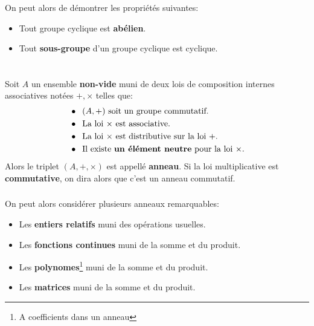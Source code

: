 \subsection*{}
On peut alors de démontrer les propriétés suivantes:

\begin{center}
   \begin{itemize}
      \item Tout groupe cyclique est \textbf{abélien}.
      \item Tout \textbf{sous-groupe} d'un groupe cyclique est cyclique.
   \end{itemize}
\end{center}

\chapter*{}
Soit \(A\) un ensemble \textbf{non-vide} muni de deux lois de composition internes associatives notées \(+, \times\) telles que:
\begin{align*}
   &\bullet \;\; (A, +) \text{ soit un groupe commutatif.} \\
   &\bullet \;\; \text{La loi \(\times\) est associative.}\\
   &\bullet \;\; \text{La loi \(\times\) est distributive sur la loi \(+\).}\\
   &\bullet \;\; \text{Il existe \textbf{un élément neutre} pour la loi \(\times\).}
\end{align*}
Alors le triplet \((A, +, \times)\) est appellé \textbf{anneau}. Si la loi multiplicative est \textbf{commutative}, on dira alors que c'est un anneau commutatif.
\subsection*{}
On peut alors considérer plusieurs anneaux remarquables:
\begin{itemize}
   \item Les \textbf{entiers relatifs} muni des opérations usuelles.
   \item Les \textbf{fonctions continues} muni de la somme et du produit.
   \item Les \textbf{polynomes}\footnote{\label{coeff}A coefficients dans un anneau} muni de la somme et du produit.
   \item Les \textbf{matrices} muni de la somme et du produit.
\end{itemize}

